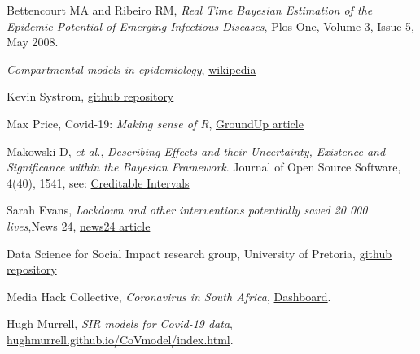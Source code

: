 \documentclass[11pt]{article}
\newcommand{\etal}{\textit{et al.}}
\begin{document}
\begin{thebibliography}{99}

Bettencourt MA and Ribeiro RM, {\em Real Time Bayesian Estimation of the Epidemic Potential of Emerging Infectious Diseases}, Plos One, Volume 3, Issue 5, May 2008.

 {\em Compartmental models in epidemiology},
\href{http://en.wikipedia.org/wiki/Compartmental_models_in_epidemiology}{wikipedia}

 Kevin Systrom, 
\href{https://github.com/k-sys/covid-19/blob/master/Realtime%20Rt%20mcmc.ipynb}{github repository}

 Max Price, Covid-19: {\em Making sense of R}, 
\href{https://www.groundup.org.za/article/covid-19-making-sense-of-r}{GroundUp article}

 Makowski D, \etal,  {\em Describing Effects and their Uncertainty, Existence and Significance within the Bayesian Framework}. Journal of Open Source Software, 4(40), 1541, see: 
\href{https://easystats.github.io/bayestestR/articles/credible_interval.html}{Creditable Intervals}

 Sarah Evans, {\em Lockdown and other interventions potentially saved 20 000 lives},News 24, \href{https://www.news24.com/SouthAfrica/News/lockdown-and-other-interventions-potentially-saved-20-000-lives-top-scientist-20200513}{news24 article}

 Data Science for Social Impact research group, University of Pretoria, \href{https://raw.githubusercontent.com/dsfsi/covid19za/master/data/covid19za_provincial_cumulative_timeline_confirmed.csv} {github repository}
 
Media Hack Collective, {\em Coronavirus in South Africa},
\href{https://mediahack.co.za/datastories/coronavirus/dashboard/}{Dashboard}.

Hugh Murrell, {\em SIR models for Covid-19 data},
\href{https://hughmurrell.github.io/CoVmodel/index.html}{hughmurrell.github.io/CoVmodel/index.html}.

\end{thebibliography}
\end{document}
